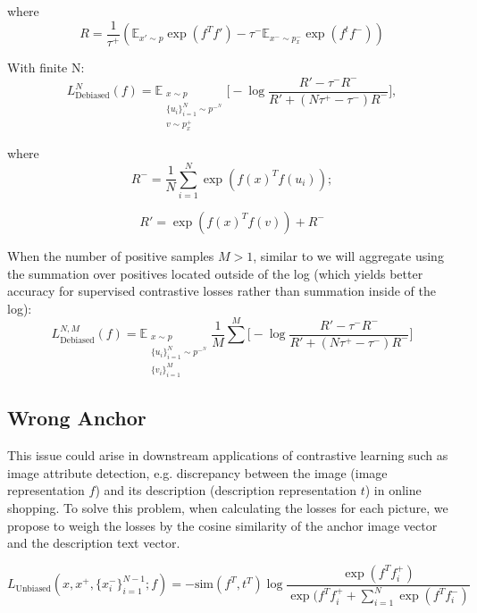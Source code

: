 \documentclass{article}
\begin{document}
where
\begin{equation}
R = \frac{1}{\tau^+} (\mathbb{E}_{x' \sim p} \exp(f^Tf') - \tau^- \mathbb{E}_{x^- \sim p_x^-} \exp(f^tf^-))
\end{equation}

With finite N:
\begin{equation} \label{eq:11}
L_{\text{Debiased}}^N (f) = \mathbb{E}_{\substack{x \sim p \\ \{u_i\}_{i=1}^N \sim p^-^N \\ v \sim p_x^+}} \bigg[-\log \frac{R' - \tau^- R^-}{R' + (N \tau^+ - \tau^-) R^-}\bigg],
\end{equation}

where
\begin{equation}
R^-= \frac{1}{N} \sum\limits_{i=1}^N \exp(f(x)^Tf(u_i));
\end{equation}

\begin{equation}
R' = \exp(f(x)^T f(v)) + R^-
\end{equation}

When the number of positive samples $M > 1$, similar to \citep{khosla2021supervised} we will aggregate using the summation over positives located outside of the log (which yields better accuracy for supervised contrastive losses rather than summation inside of the log):
\begin{equation}
L_{\text{Debiased}}^{N, M} (f) = \mathbb{E}_{\substack{x \sim p \\ \{u_i\}_{i=1}^N \sim p^-^N \\ \{v_i\}_{i=1}^M}} \frac{1}{M} \sum\limits^M \bigg[-\log \frac{R' - \tau^- R^-}{R' + (N \tau^+ - \tau^-) R^-}\bigg]
\end{equation}

\subsection{Wrong Anchor}
This issue could arise in downstream applications of contrastive learning such as image attribute detection, e.g. discrepancy between the image (image representation $f$) and its description (description representation $t$) in online shopping. To solve this problem, when calculating the losses for each picture, we propose to weigh the losses by the cosine similarity of the anchor image vector and the description text vector.

\begin{equation} \label{eq:15}
L_{\text{Unbiased}}(x, x^+, \{x_i^-\}_{i=1}^{N-1}; f) = - \text{sim} (f^T, t^T) \log \frac{\exp(f^T f_i^+)}{\exp(f^T f_i^+ + \sum_{i=1}^N \exp(f^T f_i^-)}
\end{equation}
\end{document}
